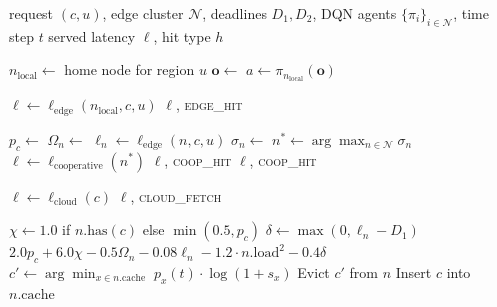\documentclass[conference]{IEEEtran}
\begin{document}
\begin{algorithm}[t]
\caption{DEADLINE\_DCCC Routing Decision}
\label{alg:routing}
\begin{algorithmic}[1]
\Require request $(c, u)$, edge cluster $\mathcal{N}$, deadlines $D_1, D_2$,
         DQN agents $\{\pi_i\}_{i \in \mathcal{N}}$, time step $t$
\Ensure  served latency $\ell$, hit type $h$

\State $n_{\mathrm{local}} \leftarrow$ home node for region $u$
\State $\mathbf{o} \leftarrow$ 
\State $a \leftarrow \pi_{n_{\mathrm{local}}}(\mathbf{o})$ 

  \State $\ell \leftarrow \ell_{\mathrm{edge}}(n_{\mathrm{local}}, c, u)$
    \State \Return $\ell$, \textsc{edge\_hit}
  \EndIf
\EndIf

  \State $p_c \leftarrow$ 
    \State $\Omega_n \leftarrow$ 
    \State $\ell_n \leftarrow \ell_{\mathrm{edge}}(n, c, u)$
    \State $\sigma_n \leftarrow$ 
  \EndFor
  \State $n^* \leftarrow \arg\max_{n \in \mathcal{N}} \sigma_n$
  \State $\ell \leftarrow \ell_{\mathrm{cooperative}}(n^*)$
      \State \Return $\ell$, \textsc{coop\_hit}
    \Else
      \State {} 
      \State \Return $\ell$, \textsc{coop\_hit}
    \EndIf
  \EndIf
\EndIf

\State $\ell \leftarrow \ell_{\mathrm{cloud}}(c)$
\State \Return $\ell$, \textsc{cloud\_fetch}

\Statex
{}
  \State $\chi \leftarrow 1.0$ if $n.\mathrm{has}(c)$ else $\min(0.5, p_c)$
  \State $\delta \leftarrow \max(0, \ell_n - D_1)$
  \State \Return $2.0 p_c + 6.0 \chi - 0.5 \Omega_n - 0.08 \ell_n
                  - 1.2 \cdot n.\mathrm{load}^2 - 0.4 \delta$
\EndFunction
\Statex
{}
    \State $c' \leftarrow \arg\min_{x \in n.\mathrm{cache}}\; p_x(t) \cdot
           \log(1 + s_x)$
    \State Evict $c'$ from $n$
  \EndIf
  \State Insert $c$ into $n.\mathrm{cache}$
\EndFunction
\end{algorithmic}
\end{algorithm}
\end{document}
